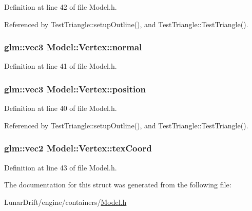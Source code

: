 Definition at line 42 of file Model.\+h.



Referenced by Test\+Triangle\+::setup\+Outline(), and Test\+Triangle\+::\+Test\+Triangle().

\subsubsection[{\texorpdfstring{normal}{normal}}]{\setlength{\rightskip}{0pt plus 5cm}glm\+::vec3 Model\+::\+Vertex\+::normal}\hypertarget{struct_model_1_1_vertex_a75c5e19722462c1ef8a5ba863db069ea}{}\label{struct_model_1_1_vertex_a75c5e19722462c1ef8a5ba863db069ea}


Definition at line 41 of file Model.\+h.

\subsubsection[{\texorpdfstring{position}{position}}]{\setlength{\rightskip}{0pt plus 5cm}glm\+::vec3 Model\+::\+Vertex\+::position}\hypertarget{struct_model_1_1_vertex_a27d09cad05dd2a74b8aa44f934441a9e}{}\label{struct_model_1_1_vertex_a27d09cad05dd2a74b8aa44f934441a9e}


Definition at line 40 of file Model.\+h.



Referenced by Test\+Triangle\+::setup\+Outline(), and Test\+Triangle\+::\+Test\+Triangle().

\subsubsection[{\texorpdfstring{tex\+Coord}{texCoord}}]{\setlength{\rightskip}{0pt plus 5cm}glm\+::vec2 Model\+::\+Vertex\+::tex\+Coord}\hypertarget{struct_model_1_1_vertex_a45595f4db5a1dc76d9a47434b1eea559}{}\label{struct_model_1_1_vertex_a45595f4db5a1dc76d9a47434b1eea559}


Definition at line 43 of file Model.\+h.



The documentation for this struct was generated from the following file\+:\begin{DoxyCompactItemize}
\item 
Lunar\+Drift/engine/containers/\hyperlink{_model_8h}{Model.\+h}\end{DoxyCompactItemize}
